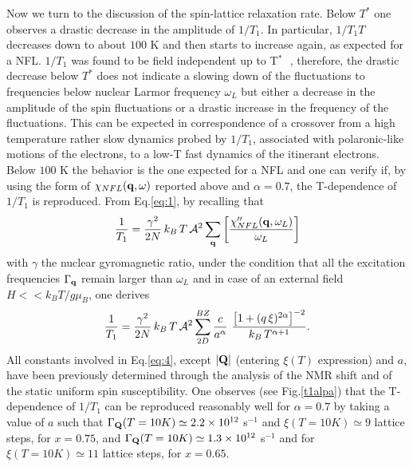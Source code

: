 \documentclass[prb,showpacs,preprintnumbers,amsmath,amssymb,floatfix]{revtex4}
\begin{document}
Now we turn to the discussion of the spin-lattice relaxation rate.
Below $T^*$ one observes a drastic decrease in the amplitude of
$1/T_1$. In particular, $1/T_1T$ decreases down to about $100$ K
and then starts to increase again, as expected for a NFL. $1/T_1$
was found to be field independent up to T$^*$\,\, \cite{Gavilano},
therefore, the drastic decrease below $T^*$ does not indicate a
slowing down of the fluctuations to frequencies below nuclear
Larmor frequency $\omega_L$ but either a decrease in the amplitude
of the spin fluctuations or a drastic increase in the frequency of
the fluctuations. This can be expected in correspondence of a
crossover from a high temperature rather slow dynamics probed by
$1/T_1$, associated with polaronic-like motions of the electrons,
to a low-T fast dynamics of the itinerant electrons. Below $100$ K
the behavior is the one expected for a NFL and one can verify if,
by using the form of $\chi_{NFL}({\bf q},\omega)$ reported above
and $\alpha=0.7$, the T-dependence of $1/T_1$ is reproduced. From
Eq.\ref{eq:1}, by recalling that \cite{Moro}
\begin{equation}
\label{eq:3} {1\over T_1}=
   \frac{{\gamma}^2}
   {2N}\,
   k_B\,T\,{\cal A}^2 \sum_{\bf q}
   \left[ \frac{\chi_{NFL} '' ({\bf q},\omega_L)}
   {\omega_L} \right]
\end{equation}
with $\gamma$ the nuclear gyromagnetic ratio, under the condition
that all the excitation frequencies $\Gamma_{\bf q}$ remain larger
than $\omega_L$ and in case of an external field $H<<
k_BT/g\mu_B$, one derives
\begin{equation}
\label{eq:4} {1\over T_1}=
   \frac{{\gamma}^2}
   {2N}\,
   k_B\,T\,{\cal A}^2
   \sum_{2D}^{BZ}
   \frac{c}{a^{\alpha}}\,\,
   \frac{\left[1+(q\,\xi)^{2\alpha}
   \right]^{-2}}{k_B\,T^{\alpha+1}} .
\end{equation}
All constants involved in Eq.\ref{eq:4}, except $\vert{\bf
Q}\vert$ (entering $\xi(T)$ expression) and $a$, have been
previously determined through the analysis of the NMR shift and of
the static uniform spin susceptibility. One observes (see
Fig.\ref{t1alpa}) that the T-dependence of $1/T_1$ can be
reproduced reasonably well for $\alpha=0.7$ by taking a value of
$a$ such that $\Gamma_{\bf Q}(T=10 K)\simeq 2.2\times 10^{12}$
s$^{-1}$ and $\xi(T=10 K)\simeq 9$ lattice steps, for $x=0.75$,
and $\Gamma_{\bf Q}(T=10 K)\simeq 1.3\times 10^{12}$ s$^{-1}$ and
for $\xi(T=10 K)\simeq 11$ lattice steps, for $x=0.65$.
\end{document}
